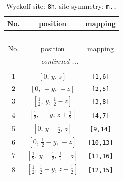 \documentclass[fleqn,8pt]{jsarticle}
\begin{document}
\begin{longtable}{ccc}
\caption{Wyckoff site: {\tt 8h}, site symmetry: {\tt m..}}
 \\
 \hline \hline
No. & position & mapping \\ \hline \endfirsthead

\multicolumn{2}{l}{\tablename\ \thetable{}} \\
 \hline \hline
No. & position & mapping \\ \hline \endhead

 \hline \hline
\multicolumn{2}{r}{\footnotesize\it continued ...} \\ \endfoot

 \hline \hline
\multicolumn{2}{r}{} \\ \endlastfoot

1 & $\left[ 0,\, y,\, z \right]$ & {\tt [1,6]} \\ \hline
2 & $\left[ 0,\, - y,\, - z \right]$ & {\tt [2,5]} \\ \hline
3 & $\left[ \frac{1}{2},\, y,\, \frac{1}{2} - z \right]$ & {\tt [3,8]} \\ \hline
4 & $\left[ \frac{1}{2},\, - y,\, z + \frac{1}{2} \right]$ & {\tt [4,7]} \\ \hline
5 & $\left[ 0,\, y + \frac{1}{2},\, z \right]$ & {\tt [9,14]} \\ \hline
6 & $\left[ 0,\, \frac{1}{2} - y,\, - z \right]$ & {\tt [10,13]} \\ \hline
7 & $\left[ \frac{1}{2},\, y + \frac{1}{2},\, \frac{1}{2} - z \right]$ & {\tt [11,16]} \\ \hline
8 & $\left[ \frac{1}{2},\, \frac{1}{2} - y,\, z + \frac{1}{2} \right]$ & {\tt [12,15]} \\
\end{longtable}
\renewcommand{\arraystretch}{1.2}
\end{document}
